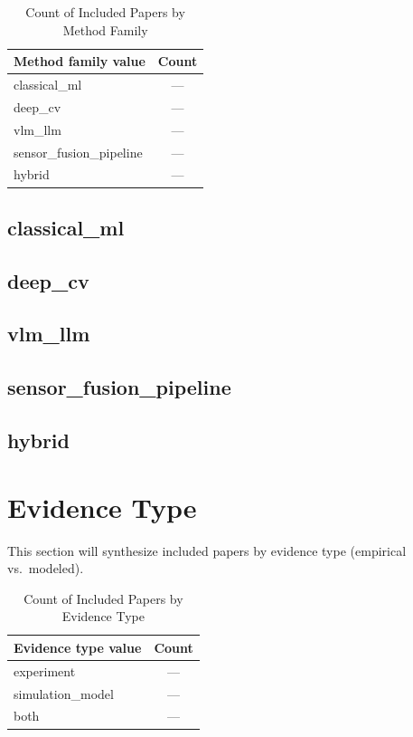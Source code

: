 \documentclass[lettersize,journal]{IEEEtran}
\begin{document}
\begin{table}[H]
\caption{Count of Included Papers by Method Family}
\label{tab:method_family_counts}
\centering
\begin{tabular}{|l|c|}
\hline
Method family value & Count\\
\hline
classical\_ml & ---\\
deep\_cv & ---\\
vlm\_llm & ---\\
sensor\_fusion\_pipeline & ---\\
hybrid & ---\\
\hline
\end{tabular}
\end{table}

\subsection{classical\_ml}

\subsection{deep\_cv}

\subsection{vlm\_llm}

\subsection{sensor\_fusion\_pipeline}

\subsection{hybrid}


\section{Evidence Type}
This section will synthesize included papers by evidence type (empirical vs.\ modeled).

\begin{table}[H]
\caption{Count of Included Papers by Evidence Type}
\label{tab:evidence_type_counts}
\centering
\begin{tabular}{|l|c|}
\hline
Evidence type value & Count\\
\hline
experiment & ---\\
simulation\_model & ---\\
both & ---\\
\hline
\end{tabular}
\end{table}
\end{document}
